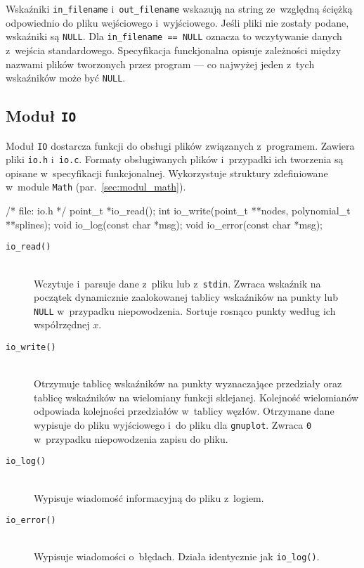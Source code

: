 \documentclass[10pt,a4paper]{article}
\newcommand{\p}[1]{\texttt{#1}}
\begin{document}
Wskaźniki \p{in\_filename} i~\p{out\_filename} wskazują na string ze~względną
ściężką odpowiednio do pliku wejściowego i~wyjściowego. Jeśli pliki nie
zostały podane, wskaźniki są \p{NULL}. Dla \p{in\_filename == NULL} oznacza to
wczytywanie danych z~wejścia standardowego. Specyfikacja funckjonalna opisuje
zależności między nazwami plików tworzonych przez program --- co najwyżej jeden
z~tych wskaźników może być \p{NULL}.

\subsection{Moduł \p{IO}}

Moduł \p{IO} dostarcza funkcji do obsługi plików związanych z~programem.
Zawiera pliki \p{io.h} i~\p{io.c}. Formaty obsługiwanych plików i~przypadki ich
tworzenia są opisane w~specyfikacji funkcjonalnej. Wykorzystuje struktury
zdefiniowane w~module \p{Math} (par.~\ref{sec:modul_math}).
\begin{SmallVerbatim}
    /* file: io.h */
    point_t *io_read();
    int io_write(point_t **nodes, polynomial_t **splines);
    void io_log(const char *msg);
    void io_error(const char *msg);
\end{SmallVerbatim}
\begin{description}
  \item[\p{io\_read()}] \hfill \\
    Wczytuje i~parsuje dane z~pliku lub z~\p{stdin}. Zwraca wskaźnik na
    początek dynamicznie zaalokowanej tablicy wskaźników na punkty lub \p{NULL}
    w~przypadku niepowodzenia. Sortuje rosnąco punkty według ich współrzędnej
    $x$.
  \item[\p{io\_write()}] \hfill \\
    Otrzymuje tablicę wskaźników na punkty wyznaczające przedziały oraz tablicę
    wskaźników na wielomiany funkcji sklejanej. Kolejność wielomianów odpowiada
    kolejności przedziałów w~tablicy węzłów. Otrzymane dane wypisuje do pliku
    wyjściowego i~do pliku dla \p{gnuplot}. Zwraca \p{0} w~przypadku
    niepowodzenia zapisu do pliku.
  \item[\p{io\_log()}] \hfill \\
    Wypisuje wiadomość informacyjną do pliku z~logiem.
  \item[\p{io\_error()}] \hfill \\
    Wypisuje wiadomości o~błędach. Działa identycznie jak \p{io\_log()}.
\end{description}
\end{document}

